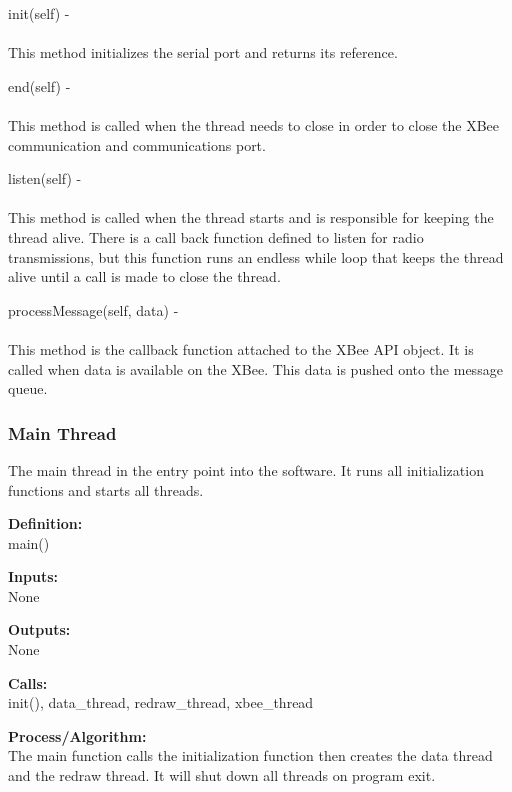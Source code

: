 \documentclass[10pt,draftclsnofoot,onecolumn,compsoc]{IEEEtran}
\begin{document}
init(self) - \\ \\
This method initializes the serial port and returns its reference. \par

end(self) - \\ \\
This method is called when the thread needs to close in order to close the XBee communication and communications port. \par

listen(self) - \\ \\
This method is called when the thread starts and is responsible for keeping the thread alive. There is a call back function defined to listen for radio transmissions, but this function runs an endless while loop that keeps the thread alive until a call is made to close the thread. \par

processMessage(self, data) - \\ \\
This method is the callback function attached to the XBee API object. It is called when data is available on the XBee. This data is pushed onto the message queue.


\subsubsection{Main Thread}
The main thread in the entry point into the software. It runs all initialization functions and starts all threads. \par
{\bf Definition:} \\ 
main() \par
{\bf Inputs:} \\  None \par
{\bf Outputs:} \\ None \par
{\bf Calls:} \\ init(), data\_thread, redraw\_thread, xbee\_thread \par
{\bf Process/Algorithm:} \\
The main function calls the initialization function then creates the data thread and the redraw thread. It will shut down all threads on program exit. \par
\end{document}
